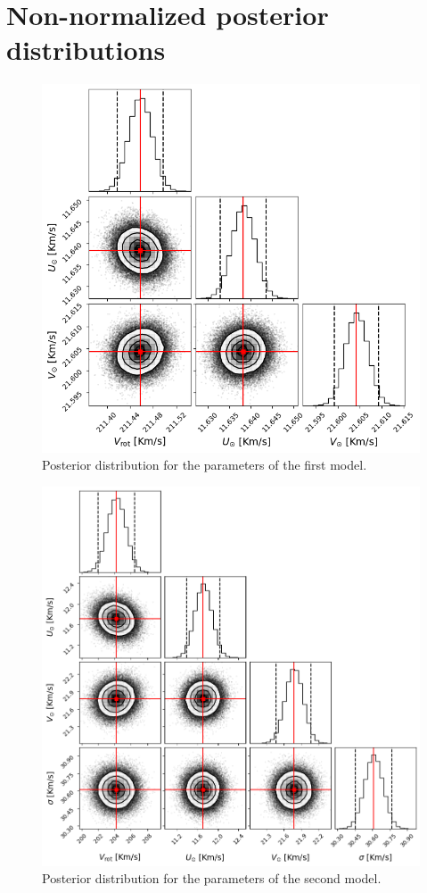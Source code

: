 \newpage
\appendix

\section{Non-normalized posterior distributions}\label{Appendix:PosteriorDistributions}

\begin{figure}[h]
    \centering
    \includegraphics[width = 0.8\linewidth]{Fig/PosteriorSimple.png}
    \caption{Posterior distribution for the parameters of the first model.}\label{fig:PosteriorSimple}
\end{figure}

\begin{figure}[h]
    \centering
    \includegraphics[width = 0.8\linewidth]{Fig/PosteriorFull.png}
    \caption{Posterior distribution for the parameters of the second model.}\label{fig:PosteriorFull}
\end{figure}